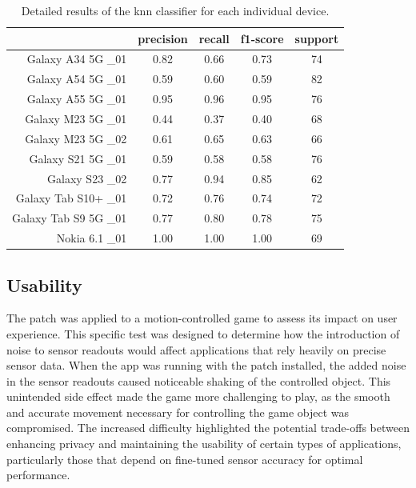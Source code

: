 \documentclass[11pt,
  oneside,openany,    %
]{scrreprt}
\begin{document}
\begin{table}[h]
  \centering
  \captionsetup{justification=centering}
  \begin{tabular}{r|cccc|}
                        & precision & recall  & f1-score  & support \\ \hline
    Galaxy A34 5G \_01  & 0.82      & 0.66    & 0.73      & 74      \\
    Galaxy A54 5G \_01  & 0.59      & 0.60    & 0.59      & 82      \\
    Galaxy A55 5G \_01  & 0.95      & 0.96    & 0.95      & 76      \\
    Galaxy M23 5G \_01  & 0.44      & 0.37    & 0.40      & 68      \\
    Galaxy M23 5G \_02  & 0.61      & 0.65    & 0.63      & 66      \\
    Galaxy S21 5G \_01  & 0.59      & 0.58    & 0.58      & 76      \\
       Galaxy S23 \_02  & 0.77      & 0.94    & 0.85      & 62      \\
  Galaxy Tab S10+ \_01  & 0.72      & 0.76    & 0.74      & 72      \\
 Galaxy Tab S9 5G \_01  & 0.77      & 0.80    & 0.78      & 75      \\
        Nokia 6.1 \_01  & 1.00      & 1.00    & 1.00      & 69      \\
  \end{tabular}
  \caption{Detailed results of the knn classifier for each individual device.}
  \label{tab:knn_detailed_results}
\end{table}

\pagebreak
\subsection{Usability}
\label{subsec:usability}
The patch was applied to a motion-controlled game \cite{krassesSpiel} to assess its impact on user experience.
This specific test was designed to determine how the introduction of noise to sensor readouts would affect applications that rely heavily on precise sensor data.
When the app was running with the patch installed, the added noise in the sensor readouts caused noticeable shaking of the controlled object.
This unintended side effect made the game more challenging to play, as the smooth and accurate movement necessary for controlling the game object was compromised.
The increased difficulty highlighted the potential trade-offs between enhancing privacy and maintaining the usability of certain types of applications, particularly those that depend on fine-tuned sensor accuracy for optimal performance.
\end{document}
